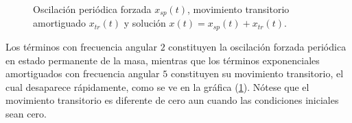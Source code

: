 \begin{ejemplo}
\begin{figure}[H]
    \caption{Oscilación periódica forzada $x_{sp}(t)$, movimiento transitorio amortiguado $x_{tr}(t)$ y solución $x(t) =x_{sp}(t) + x_{tr}(t)$.}
    \label{fig:figura_010}
\end{figure}
Los términos con frecuencia angular $2$ constituyen la oscilación forzada periódica en estado permanente de la masa, mientras que los términos exponenciales amortiguados con frecuencia angular $5$ constituyen su movimiento transitorio, el cual desaparece rápidamente, como se ve en la gráfica (\ref{fig:figura_010}). Nótese que el movimiento transitorio es diferente de cero aun cuando las condiciones iniciales sean cero.
\end{ejemplo}
